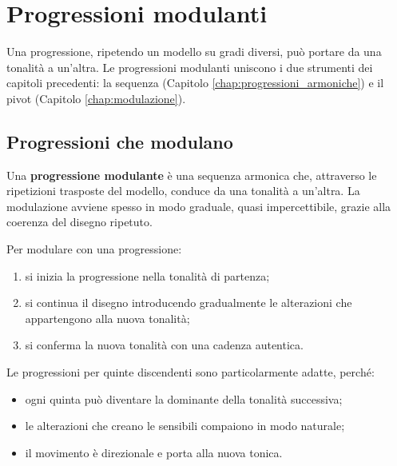 \chapter{Progressioni modulanti}
\label{chap:progressioni_modulanti}

Una progressione, ripetendo un modello su gradi diversi, può portare da una tonalità a un'altra. Le progressioni modulanti uniscono i due strumenti dei capitoli precedenti: la sequenza (Capitolo \ref{chap:progressioni_armoniche}) e il pivot (Capitolo \ref{chap:modulazione}).

\section{Progressioni che modulano}
\label{sec:progressioni_modulanti}

\begin{definizione}
	\label{def:progressione_modulante}
	Una \textbf{progressione modulante} è una sequenza armonica che, attraverso le ripetizioni trasposte del modello, conduce da una tonalità a un'altra. La modulazione avviene spesso in modo graduale, quasi impercettibile, grazie alla coerenza del disegno ripetuto.
\end{definizione}

\begin{regola}
	\label{reg:modulazione_progressioni}
	Per modulare con una progressione:
	\begin{enumerate}
		\item si inizia la progressione nella tonalità di partenza;
		\item si continua il disegno introducendo gradualmente le alterazioni che appartengono alla nuova tonalità;
		\item si conferma la nuova tonalità con una cadenza autentica.
	\end{enumerate}
	Le progressioni per quinte discendenti sono particolarmente adatte, perché:
	\begin{itemize}
		\item ogni quinta può diventare la dominante della tonalità successiva;
		\item le alterazioni che creano le sensibili compaiono in modo naturale;
		\item il movimento è direzionale e porta alla nuova tonica.
	\end{itemize}
\end{regola}

